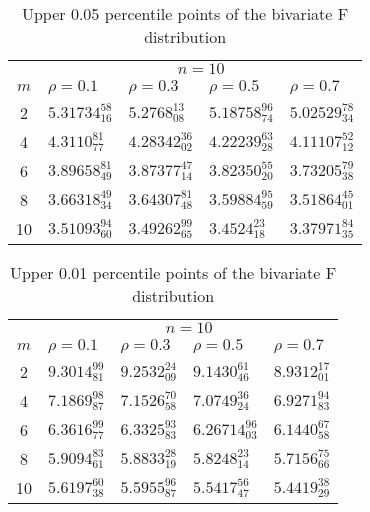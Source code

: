 %


\newdimen\captionwidth \captionwidth=3.5in
\renewcommand{\arraystretch}{1.35}
\begin{table}[ht!]
\caption{Upper 0.05 percentile points of the bivariate F distribution \label{biv2}}
\begin{center}
\begin{tabular}{|c|l|l|l|l|} \hline
& \multicolumn{4}{c|}{$n=10$} \\ \cline{2-5}
$m$ & $ \rho=0.1$         & $ \rho=0.3$          & $ \rho=0.5$
& $ \rho=0.7$ \\ \hline
2 & $5.31734_{16}^{58}$  & $5.2768_{08}^{13}$  & $5.18758_{74}^{96}$ &  $5.02529_{34}^{78}$ \\
4 & $4.3110_{77}^{81}$   & $4.28342_{02}^{36}$ & $4.22239_{28}^{63}$ & $4.11107_{12}^{52}$ \\
6 & $3.89658_{49}^{81}$  & $3.87377_{14}^{47}$ & $3.82350_{20}^{55}$ & $3.73205_{38}^{79}$ \\
8 & $3.66318_{34}^{49}$  & $3.64307_{48}^{81}$ & $3.59884_{59}^{95}$ & $3.51864_{01}^{45}$ \\
10 & $3.51093_{60}^{94}$ & $3.49262_{65}^{99}$ & $3.4524_{18}^{23}$ & $3.37971_{35}^{84}$ \\ \hline
\end{tabular}
\end{center}
\end{table}


\begin{table}[ht!]
\caption{Upper 0.01 percentile points of the bivariate F distribution \label{biv3}}
\begin{center}
\begin{tabular}{|c|l|l|l|l|} \hline
& \multicolumn{4}{c|}{$n=10$} \\ \cline{2-5}
$m$ & $\rho=0.1$         & $\rho=0.3$          & $\rho=0.5$          & $\rho=0.7$ \\ \hline
2 & $9.3014_{81}^{99}$ & $9.2532_{09}^{24}$ & $9.1430_{46}^{61}$ & $8.9312_{01}^{17}$  \\
4 & $7.1869_{87}^{98}$ & $7.1526_{58}^{70}$ & $7.0749_{24}^{36}$ & $6.9271_{83}^{94}$   \\
6 & $6.3616_{77}^{99}$ & $6.3325_{83}^{93}$ & $6.26714_{03}^{96}$ & $6.1440_{58}^{67}$  \\
8 & $5.9094_{61}^{83}$ & $5.8833_{19}^{28}$ & $5.8248_{14}^{23}$ & $5.7156_{66}^{75}$   \\
10 &$5.6197_{38}^{60}$ & $5.5955_{87}^{96}$ & $5.5417_{47}^{56}$ & $5.4419_{29}^{38}$    \\ \hline
\end{tabular}
\end{center}
\end{table}
\renewcommand{\arraystretch}{1.0}
